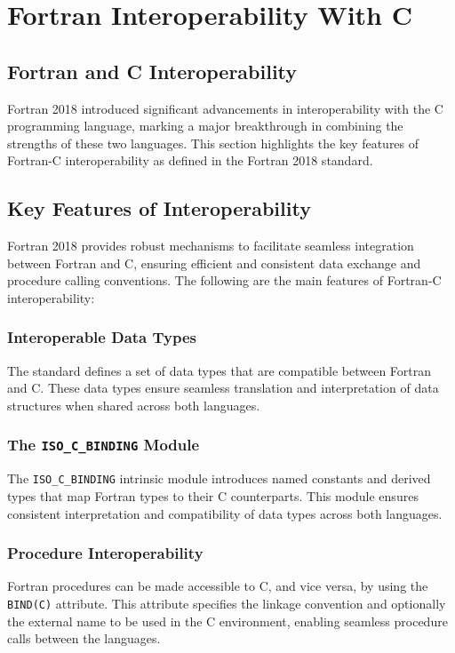 % 

\section{Fortran Interoperability With C}

\subsection{Fortran and C Interoperability}

Fortran 2018 introduced significant advancements in interoperability with the C programming language, marking a major breakthrough in combining the strengths of these two languages. This section highlights the key features of Fortran-C interoperability as defined in the Fortran 2018 standard.

\subsection{Key Features of Interoperability}

Fortran 2018 provides robust mechanisms to facilitate seamless integration between Fortran and C, ensuring efficient and consistent data exchange and procedure calling conventions. The following are the main features of Fortran-C interoperability:

\subsubsection{Interoperable Data Types}
The standard defines a set of data types that are compatible between Fortran and C. These data types ensure seamless translation and interpretation of data structures when shared across both languages.

\subsubsection{The \texttt{ISO\_C\_BINDING} Module}
The \texttt{ISO\_C\_BINDING} intrinsic module introduces named constants and derived types that map Fortran types to their C counterparts. This module ensures consistent interpretation and compatibility of data types across both languages.

\subsubsection{Procedure Interoperability}
Fortran procedures can be made accessible to C, and vice versa, by using the \texttt{BIND(C)} attribute. This attribute specifies the linkage convention and optionally the external name to be used in the C environment, enabling seamless procedure calls between the languages.

